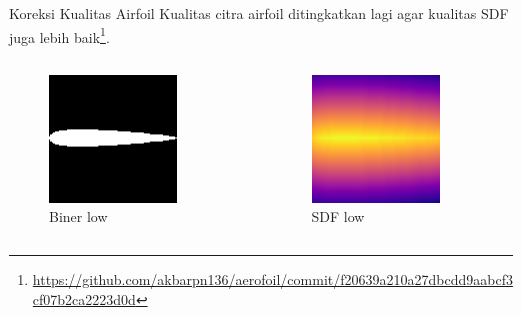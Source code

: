 \begin{frame}{Koreksi Kualitas Airfoil}
  Kualitas citra airfoil ditingkatkan lagi agar kualitas SDF juga lebih baik\footnote{\url{https://github.com/akbarpn136/aerofoil/commit/f20639a210a27dbcdd9aabcf3cf07b2ca2223d0d}}.

  \pause

  \begin{columns}[t]
    \begin{column}{.25\linewidth}
      \begin{figure}[h]
        \centering
        \includegraphics[width=0.8\linewidth]{statics/airfoil_low.png}
        \caption{Biner low}
      \end{figure}
    \end{column}

    \begin{column}{.25\linewidth}
      \begin{figure}[h]
        \centering
        \includegraphics[width=0.8\linewidth]{statics/airfoil_sdf_low.png}
        \caption{SDF low}
      \end{figure}
    \end{column}


\end{columns}
\end{frame}
